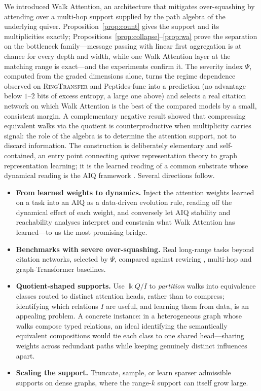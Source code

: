 \documentclass[runningheads]{llncs}
\newcommand{\kk}{\Bbbk}
\newcommand{\kQ}{\kk Q}
\begin{document}
We introduced Walk Attention, an architecture that mitigates over-squashing by
attending over a multi-hop support supplied by the path algebra of the
underlying quiver. Proposition~\ref{prop:count} gives the support and its
multiplicities exactly; Propositions~\ref{prop:collapse}--\ref{prop:wa} prove
the separation on the bottleneck family---message passing with linear first
aggregation is at chance for every depth and width, while one Walk Attention
layer at the matching range is exact---and the experiments confirm it. The
severity index $\Psi$, computed from the graded dimensions alone, turns the
regime dependence observed on \textsc{RingTransfer} and Peptides-func into a
prediction (no advantage below $1$--$2$ bits of excess entropy, a large one
above) and selects a real citation network on which Walk Attention is the best
of the compared models by a small, consistent margin. A complementary negative
result showed that compressing equivalent walks via the
quotient is counterproductive when multiplicity carries signal: the role of the
algebra is to determine the attention support, not to discard information. The
construction is deliberately elementary and self-contained, an entry point
connecting quiver representation theory to graph representation learning; it
is the learned reading of a common substrate whose dynamical reading is the
AIQ framework \cite{zainea2026aiq}. Several directions follow.

\begin{itemize}
  \item \textbf{From learned weights to dynamics.} Inject the attention weights
  learned on a task into an AIQ as a data-driven evolution rule, reading off
  the dynamical effect of each weight, and conversely let AIQ stability and
  reachability analyses interpret and constrain what Walk Attention has
  learned---to us the most promising bridge.
  \item \textbf{Benchmarks with severe over-squashing.} Real long-range tasks
  beyond citation networks, selected by $\Psi$, compared against rewiring
  \cite{topping2022understanding}, multi-hop \cite{gutteridge2023drew} and
  graph-Transformer baselines.
  \item \textbf{Quotient-shaped supports.} Use $\kQ/I$ to \emph{partition}
  walks into equivalence classes routed to distinct attention heads, rather
  than to compress; identifying which relations $I$ are useful, and learning
  them from data, is an appealing problem. A concrete instance: in a
  heterogeneous graph whose walks compose typed relations, an ideal identifying
  the semantically equivalent compositions would tie each class to one shared
  head---sharing weights across redundant paths while keeping genuinely
  distinct influences apart.
  \item \textbf{Scaling the support.} Truncate, sample, or learn sparser
  admissible supports on dense graphs, where the range-$k$ support can itself
  grow large.
\end{itemize}
\end{document}
